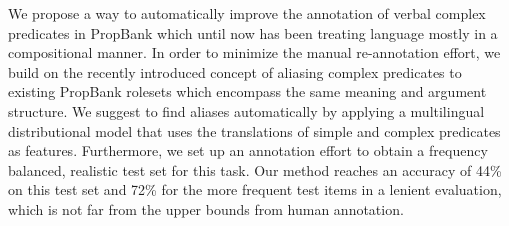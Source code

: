 We propose a way to automatically improve the annotation of verbal complex predicates in PropBank which until now has been treating language mostly in a compositional manner. In order to minimize the manual re-annotation effort, we build on the recently introduced concept of aliasing complex predicates to existing PropBank rolesets which encompass the same meaning and argument structure. We suggest to find aliases automatically by applying a multilingual distributional model that uses the translations of simple and complex predicates as features. Furthermore, we set up an annotation effort to obtain a frequency balanced, realistic test set for this task. Our method reaches an accuracy of 44\% on this test set and 72\% for the more frequent test items in a lenient evaluation, which is not far from the upper bounds from human annotation.
